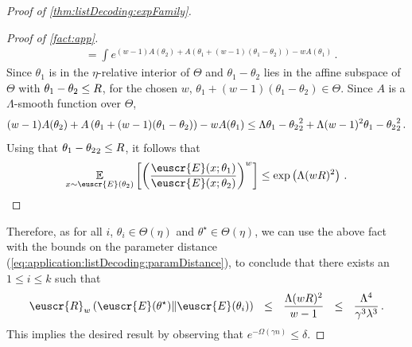 \documentclass[11pt]{article}
\theoremstyle{plain}
\theoremstyle{definition}
\theoremstyle{remark}
\newcommand{\inparen}[1]{\left(#1\right)}
\newcommand{\insquare}[1]{\left[#1\right]}
\let\norm\relax
\newcommand{\norm}[1]{\ensuremath{\left\lVert #1 \right\rVert}}
\newcommand{\E}{\operatornamewithlimits{\mathbb{E}}}
\newcommand{\Ex}{\E}
\newcommand{\renyi}[3]{\cR_{#1}\inparen{#2\|#3}}
\newcommand{\customcal}[1]{\euscr{#1}}
\newcommand{\cE}{\customcal{E}}
\newcommand{\cR}{\customcal{R}}
\begin{document}
\begin{proof}[Proof of \cref{thm:listDecoding:expFamily}]
\begin{proof}[Proof of \cref{fact:app}]
\begin{align*}
                            &=
                            \int  e^{
                                    ({w}-1)A(\theta_2)+ A\inparen{\theta_1+({w}-1)(\theta_1 - \theta_2)} - {w}A(\theta_1) 
                                }
                             \,.
                        \end{align*}
                        Since $\theta_1$ is in the $\eta$-relative interior of $\Theta$ and $\theta_1-\theta_2$ lies in the affine subspace of $\Theta$ with $\norm{\theta_1-\theta_2}\leq R$, for the chosen ${w}$, $\theta_1+({w}-1)(\theta_1 - \theta_2)\in \Theta$.
                        Since $A$ is a $\Lambda$-smooth function over $\Theta$, 
                        \[
                            ({w}-1)A(\theta_2)+ A\inparen{\theta_1+({w}-1)(\theta_1 - \theta_2)} - {w}A(\theta_1) \leq \Lambda \norm{\theta_1-\theta_2}_2^2
                            + \Lambda({w}-1)^2\norm{\theta_1-\theta_2}_2^2\,.
                        \]
                        Using that $\norm{\theta_1-\theta_2}_2\leq R$, it follows that
                        \[
                            \Ex_{x\sim \cE(\theta_2)}\insquare{
                            \inparen{
                                \frac{
                                    \cE(x; \theta_1)
                                }{
                                    \cE(x; \theta_2)
                                }
                                }^{w}
                            }
                            \leq 
                            \exp\inparen{
                                \Lambda ({w}R)^2
                            }
                            \,.
                        \]
                    \end{proof}
                Therefore, as for all $i$, $\theta_i\in \Theta(\eta)$ and $\theta^\star\in \Theta(\eta)$, we can use the above fact with the bounds on the parameter distance (\cref{eq:application:listDecoding:paramDistance}), 
                to conclude that there exists an $1\leq i\leq k$ such that 
                \[
                    \renyi{{w}}{\cE(\theta^\star)}{\cE(\theta_i)}
                    ~~\leq~~
                    \frac{\Lambda ({w}R)^2}{{w}-1}
                    ~~\leq~~ 
                    \frac{
                        \Lambda^4
                    }{
                        \gamma^3\lambda^3 
                    }\,.
                \]
                This implies the desired result by observing that $e^{-\Omega(\gamma n)}\leq \delta$.
            \end{proof}
\end{document}

